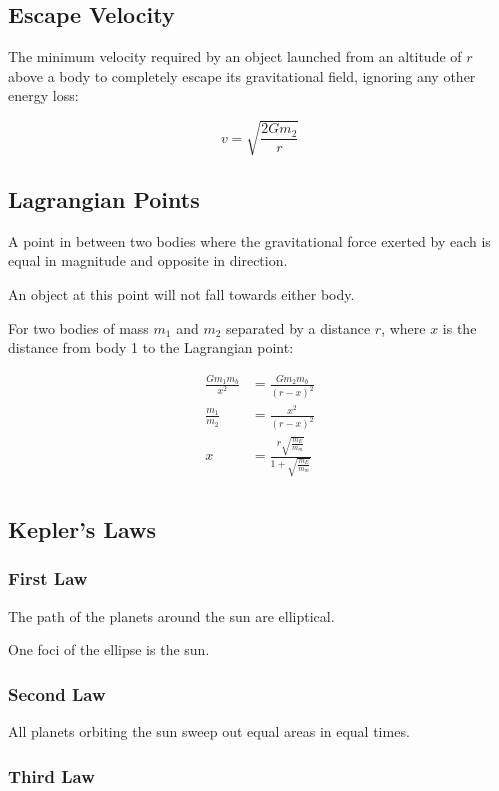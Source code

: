 \documentclass[a4paper,11pt]{article}
\begin{document}
\subsection{Escape Velocity}

The minimum velocity required by an object launched from an altitude of $r$
above a body to completely escape its gravitational field, ignoring any other
energy loss:

$$
v = \sqrt{\frac{2 G m_2}{r}}
$$


\subsection{Lagrangian Points}

A point in between two bodies where the gravitational force exerted by each is
equal in magnitude and opposite in direction.

An object at this point will not fall towards either body.

For two bodies of mass $m_1$ and $m_2$ separated by a distance $r$, where $x$
is the distance from body 1 to the Lagrangian point:

$$
\begin{aligned}
\frac{G m_1 m_b}{x^2} & = \frac{G m_2 m_b}{(r - x)^2} \\
\frac{m_1}{m_2} & = \frac{x^2}{(r - x)^2} \\
x & = \frac{r\sqrt{\frac{m_E}{m_m}}}{1 + \sqrt{\frac{m_E}{m_m}}} \\
\end{aligned}
$$


\subsection{Kepler's Laws}

\subsubsection{First Law}

The path of the planets around the sun are elliptical.

One foci of the ellipse is the sun.


\subsubsection{Second Law}

All planets orbiting the sun sweep out equal areas in equal times.


\subsubsection{Third Law}
\end{document}
